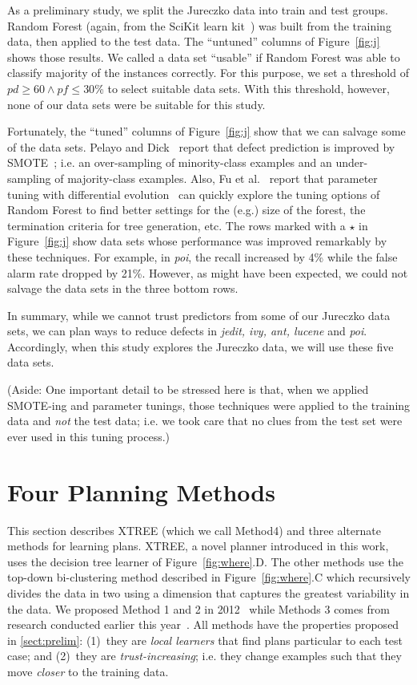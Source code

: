 \documentclass{sig-alternate}
\newcommand{\tion}[1]{\textsection\ref{sect:#1}}
\newcommand{\fig}[1]{Figure~\ref{fig:#1}}
\begin{document}
As a preliminary study, we split the Jureczko  data into train and test groups.
Random Forest (again, from the SciKit learn kit~\cite{Pedregosa2012}) was
built from the training data, then applied to the test data.
The ``untuned'' columns of \fig{j} shows those results. We called a data set ``usable'' if Random Forest was able to classify majority of the instances correctly. For this purpose, we set a threshold of $\mathit{pd}\ge 60 \wedge \mathit{pf} \le 30$\% to select suitable data sets. With this threshold, however, none of our data sets were be suitable for this study.

Fortunately, the ``tuned'' columns of \fig{j} show that we can salvage some of the data sets. Pelayo and Dick~\cite{pelayo07} report that defect prediction is improved by SMOTE~\cite{Chawla2002}; i.e. an over-sampling of minority-class examples and an under-sampling of majority-class examples. Also, Fu et al.~\cite{fu:ase15} report that parameter tuning with differential evolution~\cite{storn97} can quickly explore the tuning options of Random Forest to find better settings for the (e.g.) size of the forest, the termination criteria
for tree generation, etc. The rows \colorbox{celadon}{marked with a $\star$} in \fig{j} show data sets whose performance was improved remarkably by these techniques. For example, in {\em poi}, the recall increased by 4\% while the false alarm rate dropped by 21\%. However,  as might have been expected, we could not salvage the data sets in the  three bottom rows.

In summary, while we cannot trust predictors from some of our Jureczko data sets,
we can plan ways to reduce defects in {\em jedit, ivy, ant, lucene} and {\em poi}.
Accordingly, when this study explores the Jureczko data, we will use these five data sets.

(Aside: One important detail to be stressed here is that, when we applied    SMOTE-ing and
parameter tunings, those techniques were applied to the training data and {\em not}
the test data; i.e. we took care that no clues from the test set were ever used in this tuning process.)



 
\section{Four Planning Methods}\label{sect:planners}
 
This section describes XTREE (which we call Method4) and  three  
alternate methods for learning plans.
  XTREE, a novel planner introduced in this work,  uses the decision tree learner of \fig{where}.D.
  The other methods use the   top-down
	bi-clustering method described in \fig{where}.C  which recursively divides the
	data in two  using a dimension that captures the greatest variability in the data. 
	We proposed Method 1 and 2   in 2012~\cite{me12c} while Methods 3 comes from research conducted earlier this year~\cite{krishna15}. 
All  methods have the  properties proposed in \tion{prelim}: (1)~they are {\em local learners}
that find   plans   particular to each test case; and (2)~they  are {\em trust-increasing}; 
  i.e. they change  examples such that they move {\em closer} to the training data.
 
\end{document}

